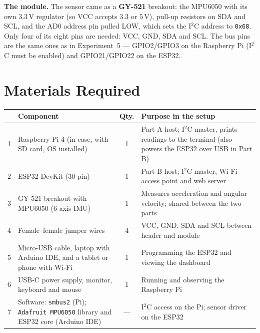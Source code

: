 \documentclass[10pt,a4paper]{article}
\begin{document}
\begin{notebox}
\textbf{The module.} The sensor came as a \textbf{GY-521} breakout: the MPU6050 with its
own $3.3\,\mathrm{V}$ regulator (so VCC accepts $3.3$ or $5\,\mathrm{V}$), pull-up
resistors on SDA and SCL, and the AD0 address pin pulled LOW, which sets the I$^2$C
address to \texttt{0x68}. Only four of its eight pins are needed: VCC, GND, SDA and
SCL. The bus pins are the same ones as in Experiment~5 --- GPIO2/GPIO3 on the Raspberry
Pi (I$^2$C must be enabled) and GPIO21/GPIO22 on the ESP32.
\end{notebox}

\section{Materials Required}

\noindent
\begin{tabularx}{\textwidth}{@{}p{0.4cm} >{\raggedright\arraybackslash}p{5.6cm} c X@{}}
\toprule
\rowcolor{soft}
\multicolumn{1}{@{}l}{\textbf{\#}} & \textbf{Component} & \textbf{Qty.} & \textbf{Purpose in the setup} \\
\midrule
1 & Raspberry Pi 4 (in case, with SD card, OS installed) & 1 & Part A host; I$^2$C master, prints readings to the terminal (also powers the ESP32 over USB in Part B) \\
2 & ESP32 DevKit (30-pin)                                 & 1 & Part B host; I$^2$C master, Wi-Fi access point and web server \\
3 & GY-521 breakout with MPU6050 (6-axis IMU)             & 1 & Measures acceleration and angular velocity; shared between the two parts \\
4 & Female--female jumper wires                            & 4 & VCC, GND, SDA and SCL between header and module \\
5 & Micro-USB cable, laptop with Arduino IDE, and a tablet or phone with Wi-Fi & 1 & Programming the ESP32 and viewing the dashboard \\
6 & USB-C power supply, monitor, keyboard and mouse        & 1 & Running and observing the Raspberry Pi \\
7 & Software: \texttt{smbus2} (Pi); \texttt{Adafruit MPU6050} library and ESP32 core (Arduino IDE) & --- & I$^2$C access on the Pi; sensor driver on the ESP32 \\
\bottomrule
\end{tabularx}
\end{document}
